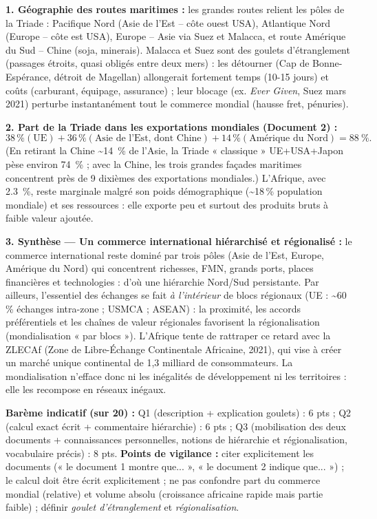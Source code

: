 \documentclass[11pt]{article}
\newcommand{\cle}[1]{{\popxbold\color{popdark}#1}}
\begin{document}
\begin{corrige}
\textbf{1. Géographie des routes maritimes :} les grandes routes relient les pôles de la Triade : Pacifique Nord (Asie de l'Est -- côte ouest USA), Atlantique Nord (Europe -- côte est USA), Europe -- Asie via Suez et Malacca, et route Amérique du Sud -- Chine (soja, minerais). Malacca et Suez sont des \cle{goulets d'étranglement} (passages étroits, quasi obligés entre deux mers) : les détourner (Cap de Bonne-Espérance, détroit de Magellan) allongerait fortement temps (10-15 jours) et coûts (carburant, équipage, assurance) ; leur blocage (ex. \emph{Ever Given}, Suez mars 2021) perturbe instantanément tout le commerce mondial (hausse fret, pénuries).

\textbf{2. Part de la Triade dans les exportations mondiales (Document 2) :}
\[ 38\,\% (\text{UE}) + 36\,\% (\text{Asie de l'Est, dont Chine}) + 14\,\% (\text{Amérique du Nord}) = \SI{88}{\%}. \]
(En retirant la Chine \textasciitilde \SI{14}{\%} de l'Asie, la Triade « classique » UE+USA+Japon pèse environ \SI{74}{\%} ; avec la Chine, les trois grandes façades maritimes concentrent près de 9 dixièmes des exportations mondiales.) L'Afrique, avec \SI{2,3}{\%}, reste marginale malgré son poids démographique (\textasciitilde 18\,\% population mondiale) et ses ressources : elle exporte peu et surtout des produits bruts à faible valeur ajoutée.

\textbf{3. Synthèse — Un commerce international hiérarchisé et régionalisé :} le commerce international reste dominé par trois pôles (Asie de l'Est, Europe, Amérique du Nord) qui concentrent richesses, FMN, grands ports, places financières et technologies : d'où une \cle{hiérarchie} Nord/Sud persistante. Par ailleurs, l'essentiel des échanges se fait \emph{à l'intérieur} de blocs régionaux (UE : \textasciitilde 60\,\% échanges intra-zone ; USMCA ; ASEAN) : la proximité, les accords préférentiels et les chaînes de valeur régionales favorisent la \cle{régionalisation} (mondialisation « par blocs »). L'Afrique tente de rattraper ce retard avec la \cle{ZLECAf} (Zone de Libre-Échange Continentale Africaine, 2021), qui vise à créer un marché unique continental de 1,3 milliard de consommateurs. La mondialisation n'efface donc ni les inégalités de développement ni les territoires : elle les recompose en réseaux inégaux.

\textbf{Barème indicatif (sur 20) :} Q1 (description + explication goulets) : 6 pts ; Q2 (calcul exact écrit + commentaire hiérarchie) : 6 pts ; Q3 (mobilisation des deux documents + connaissances personnelles, notions de hiérarchie et régionalisation, vocabulaire précis) : 8 pts.
\textbf{Points de vigilance :} citer explicitement les documents (« le document 1 montre que... », « le document 2 indique que... ») ; le calcul doit être écrit explicitement ; ne pas confondre part du commerce mondial (relative) et volume absolu (croissance africaine rapide mais partie faible) ; définir \emph{goulet d'étranglement} et \emph{régionalisation}.
\end{corrige}
\end{document}
